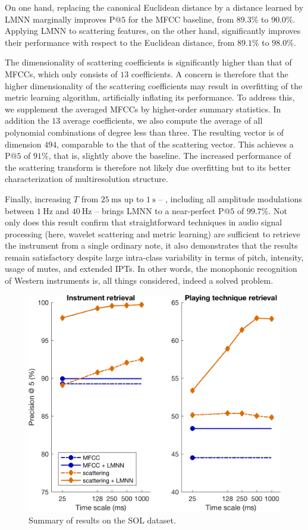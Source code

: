 On one hand, replacing the canonical Euclidean distance by a distance learned by LMNN marginally improves P@$5$ for the MFCC baseline, from $89.3\%$ to $90.0\%$.
Applying LMNN to scattering features, on the other hand, significantly improves their performance with respect to the Euclidean distance, from $89.1\%$ to $98.0\%$.

The dimensionality of scattering coefficients is significantly higher than that of MFCCs, which only consists of $13$ coefficients.
A concern is therefore that the higher dimensionality of the scattering coefficients may result in overfitting of the metric learning algorithm, artificially inflating its performance.
To address this, we supplement the averaged MFCCs by higher-order summary statistics.
In addition the $13$ average coefficients, we also compute the average of all polynomial combinations of degree less than three.
The resulting vector is of dimension $494$, comparable to the that of the scattering vector.
This achieves a P@$5$ of $91\%$, that is, slightly above the baseline.
The increased performance of the scattering transform is therefore not likely due overfitting but to its better characterization of multiresolution structure.

Finally, increasing $T$ from $\SI{25}{\milli\second}$ up to $\SI{1}{\second}$ -- \ie{}, including all amplitude modulations between $\SI{1}{\Hz}$ and $\SI{40}{\Hz}$ -- brings LMNN to a near-perfect P@$5$ of $99.7\%$.
Not only does this result confirm that straightforward techniques in audio signal processing (here, wavelet scattering and metric learning) are sufficient to retrieve the instrument from a single ordinary note, it also demonstrates that the results remain satisfactory despite large intra-class variability in terms of pitch, intensity, usage of mutes, and extended IPTs.
In other words, the monophonic recognition of Western instruments is, all things considered, indeed a solved problem.

\begin{figure}
\includegraphics[width=\linewidth,keepaspectratio]{results.png}
\caption{Summary of results on the SOL dataset.}
\label{fig:results}
\end{figure}

